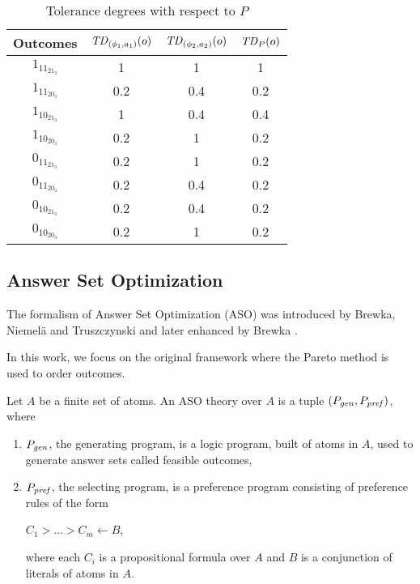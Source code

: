 \begin{table}
  \centering
  \small
  \begin{tabular}{ |c||c|c|c| }
    \hline
    Outcomes                 & $\mathit{TD}_{(\phi_1,a_1)}(o)$  & $\mathit{TD}_{(\phi_2,a_2)}(o)$ & $\mathit{TD}_P(o)$ \\
    \hline \hline
    $1_11_21_3$    								 & 1    & 1     & 1 \\
    \hline
    $1_11_20_3$               & 0.2  & 0.4   & 0.2 \\
    \hline
    $1_10_21_3$              & 1    & 0.4   & 0.4 \\
    \hline
    $1_10_20_3$          & 0.2  & 1     & 0.2 \\
    \hline
    $0_11_21_3$              & 0.2  & 1     & 0.2 \\
    \hline
    $0_11_20_3$         & 0.2  & 0.4   & 0.2 \\
    \hline
    $0_10_21_3$        & 0.2  & 0.4   & 0.2 \\
    \hline
    $0_10_20_3$   & 0.2  & 1     & 0.2 \\
    \hline
  \end{tabular}
  \caption{Tolerance degrees with respect to $P$}
  \label{tbl:poss_ex}
\end{table}


\subsection{Answer Set Optimization}
The formalism of Answer Set Optimization (ASO) was introduced by
Brewka, Niemel\"a and Truszczynski \cite{Brewka03answerset} and
later enhanced by Brewka \cite{Brewka04}.

In this work, we focus on the original framework \cite{Brewka03answerset} where 
the Pareto method is used to order outcomes.

\begin{definition}
	Let $A$ be a finite set of atoms.
	An ASO theory over $A$ is a tuple $(P_{\mathit{gen}},P_{\mathit{pref}})$, where
	\begin{enumerate} \itemsep -4pt
		\item $P_{\mathit{gen}}$, the generating program, is a logic program, 
					built of atoms in $A$,
					used to generate answer sets called feasible outcomes,
		\item $P_{\mathit{pref}}$, the selecting program, is a preference
					program consisting of preference rules of the form
			\begin{center}
				$C_1 > \ldots > C_m \leftarrow B$,
			\end{center}
					where each $C_i$ is a propositional formula
					over $A$ and $B$ is a conjunction of
					literals of atoms in $A$.
	\end{enumerate}
\end{definition}

